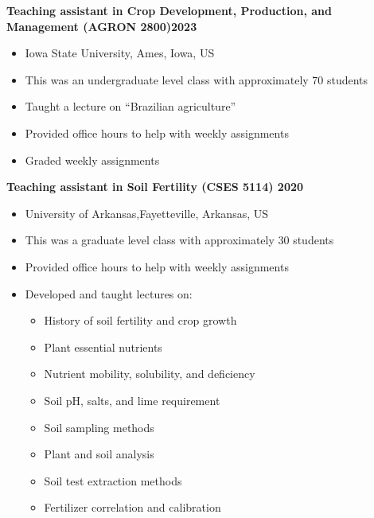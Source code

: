 \documentclass[letterpaper,10pt]{article}
\begin{document}
{\bf Teaching assistant in Crop Development,
Production, and Management (AGRON 2800)\hfill  2023}
\vspace{-.1in}
\begin{itemize}
\itemsep-0.5em
\renewcommand\labelitemi{{\boldmath$\cdot$}}
\item 
Iowa State University, Ames, Iowa, US
\item This was an undergraduate level class with approximately 70 students 
\item Taught a lecture on ``Brazilian
	agriculture''
\item Provided office hours to help with weekly
	assignments
\item Graded weekly assignments
\end{itemize}



{\bf Teaching assistant in Soil Fertility (CSES 5114) \hfill  2020}
\vspace{-.1in}
\begin{itemize}
\itemsep-0.5em
\renewcommand\labelitemi{{\boldmath$\cdot$}}
\item  University of Arkansas,Fayetteville, Arkansas, US
\item This was a graduate level class with approximately 30 students
\item Provided office hours to help with weekly
	assignments
\item Developed and taught lectures on:
\vspace{-.1in}
\begin{itemize}	
\itemsep-0.2em
\item History of soil fertility and crop growth
\item Plant essential nutrients
\item Nutrient mobility, solubility, and deficiency
\item Soil pH, salts, and lime requirement
\item Soil sampling methods
\item Plant and soil analysis
\item Soil test extraction methods
\item Fertilizer correlation and calibration 
\end{itemize}
\end{itemize}
\end{document}
